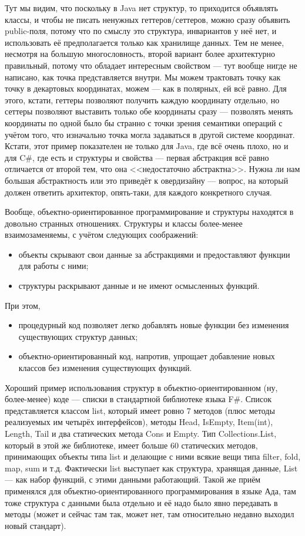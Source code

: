 \documentclass{../text-style}
\begin{document}
Тут мы видим, что поскольку в Java нет структур, то приходится объявлять классы, и чтобы не писать ненужных геттеров/сеттеров, можно сразу объявить public-поля, потому что по смыслу это структура, инвариантов у неё нет, и использовать её предполагается только как хранилище данных. Тем не менее, несмотря на большую многословность, второй вариант более архитектурно правильный, потому что обладает интересным свойством --- тут вообще нигде не написано, как точка представляется внутри. Мы можем трактовать точку как точку в декартовых координатах, можем --- как в полярных, ей всё равно. Для этого, кстати, геттеры позволяют получить каждую координату отдельно, но сеттеры позволяют выставить только обе координаты сразу --- позволять менять координаты по одной было бы странно с точки зрения семантики операций с учётом того, что изначально точка могла задаваться в другой системе координат. Кстати, этот пример показателен не только для Java, где всё очень плохо, но и для C\#, где есть и структуры и свойства --- первая абстракция всё равно отличается от второй тем, что она <<недостаточно абстрактна>>. Нужна ли нам большая абстрактность или это приведёт к овердизайну --- вопрос, на который должен ответить архитектор, опять-таки, для каждого конкретного случая.

Вообще, объектно-ориентированное программирование и структуры находятся в довольно странных отношениях. Структуры и классы более-менее взаимозаменяемы, с учётом следующих соображений:

\begin{itemize}
    \item объекты скрывают свои данные за абстракциями и предоставляют функции для работы с ними;
    \item структуры раскрывают данные и не имеют осмысленных функций.
\end{itemize}

При этом,
\begin{itemize}
    \item процедурный код позволяет легко добавлять новые функции без изменения существующих структур данных;
    \item объектно-ориентированный код, напротив, упрощает добавление новых классов без изменения существующих функций.
\end{itemize}

Хороший пример использования структур в объектно-ориентированном (ну, более-менее) коде --- списки в стандартной библиотеке языка F\#. Список представляется классом list, который имеет ровно 7 методов (плюс методы реализуемых им четырёх интерфейсов), методы Head, IsEmpty, Item(int), Length, Tail и два статических метода Cons и Empty. Тип Collections.List, который в этой же библиотеке, имеет больше 60 статических методов, принимающих объекты типа list и делающие с ними всякие вещи типа filter, fold, map, sum и т.д. Фактически list выступает как структура, хранящая данные, List --- как набор функций, с этими данными работающий. Такой же приём применялся для объектно-ориентированного программирования в языке Ада, там тоже структура с данными была отдельно и её надо было явно передавать в методы (может и сейчас там так, может нет, там относительно недавно выходил новый стандарт).
\end{document}
